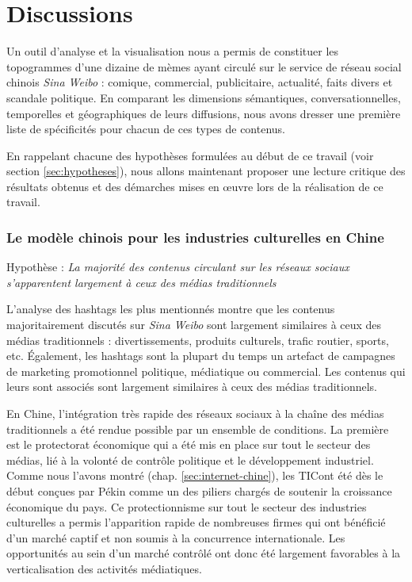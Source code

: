 \section[Discussions]{Discussions}



Un outil d{\textquoteright}analyse et la visualisation nous a permis de constituer les topogrammes d'une dizaine de mèmes ayant circulé sur le service de réseau social chinois \textit{Sina Weibo} : comique, commercial, publicitaire, actualité, faits divers et scandale politique.  En comparant les dimensions sémantiques, conversationnelles, temporelles et géographiques de leurs diffusions, nous avons dresser une première liste de spécificités pour chacun de ces types de contenus.

En rappelant chacune des hypothèses formulées au début de ce travail (voir section \ref{sec:hypotheses}), nous allons maintenant proposer une lecture critique des résultats obtenus et des démarches mises en œuvre lors de la réalisation de ce travail. 

\subsubsection{Le modèle chinois pour les industries culturelles en Chine} 

Hypothèse : \textit{La majorité des contenus circulant sur les réseaux sociaux s'apparentent largement à ceux des médias traditionnels} 

L{\textquoteright}analyse des hashtags les plus mentionnés montre que les contenus majoritairement discutés sur \textit{Sina Weibo} sont largement similaires à ceux des médias traditionnels : divertissements, produits culturels, trafic routier, sports, etc. \'Egalement, les hashtags sont la plupart du temps un artefact de campagnes de marketing promotionnel politique, médiatique ou commercial. Les contenus qui leurs sont associés sont largement similaires à ceux des médias traditionnels.

En Chine, l'intégration très rapide des réseaux sociaux à la chaîne des médias traditionnels a été rendue possible par un ensemble de conditions. La première est le protectorat économique qui a été mis en place sur tout le secteur des médias, lié à la volonté de contrôle politique et le développement industriel. Comme nous l'avons montré (chap. \ref{sec:internet-chine}), les TICont été dès le début conçues par Pékin comme un des piliers chargés de soutenir la croissance économique du pays. Ce protectionnisme sur tout le secteur des industries culturelles a permis l'apparition rapide de nombreuses firmes qui ont bénéficié d'un marché captif et non soumis à la concurrence internationale. Les opportunités au sein d'un marché contrôlé ont donc été largement favorables à la verticalisation des activités médiatiques.

